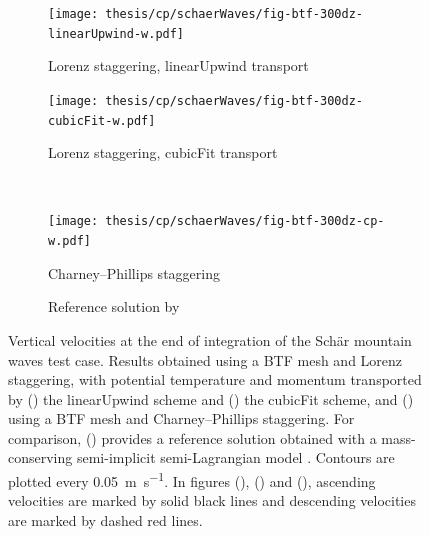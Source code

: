 \begin{figure}
	\centering
	\begin{subfigure}{0.55\textwidth}
		\centering
		\caption{Lorenz staggering, linearUpwind transport}
		\label{fig:cp:schaerWaves:w:linearUpwind}
		\texttt{[image: thesis/cp/schaerWaves/fig-btf-300dz-linearUpwind-w.pdf]}
	\end{subfigure}
	\begin{subfigure}{0.44\textwidth}
		\centering
		\caption{Lorenz staggering, cubicFit transport}
		\label{fig:cp:schaerWaves:w:cubicFit}
		\texttt{[image: thesis/cp/schaerWaves/fig-btf-300dz-cubicFit-w.pdf]}
	\end{subfigure}
	\\
	\vspace*{1em}
	\begin{subfigure}{0.55\textwidth}
		\centering
		\caption{Charney--Phillips staggering}
		\label{fig:cp:schaerWaves:w:cp}
		\texttt{[image: thesis/cp/schaerWaves/fig-btf-300dz-cp-w.pdf]}
	\end{subfigure}
	\begin{subfigure}{0.44\textwidth}
		\centering
		\caption{Reference solution by \citet{melvin2010}}
		\label{fig:cp:schaerWaves:w:melvin}
	\end{subfigure}
	\caption{Vertical velocities at the end of integration of the Sch\"{a}r mountain waves test case.
	Results obtained using a BTF mesh and Lorenz staggering, with potential temperature and momentum transported by () the linearUpwind scheme and
	() the cubicFit scheme, and () using a BTF mesh and Charney--Phillips staggering.
	For comparison, () provides a reference solution obtained with a mass-conserving semi-implicit semi-Lagrangian model \citep{melvin2010}.
	Contours are plotted every \SI{0.05}{\meter\per\second}.  In figures (), () and (), ascending velocities are marked by solid black lines and descending velocities are marked by dashed red lines.}
	\label{fig:cp:schaerWaves:w}
\end{figure}

